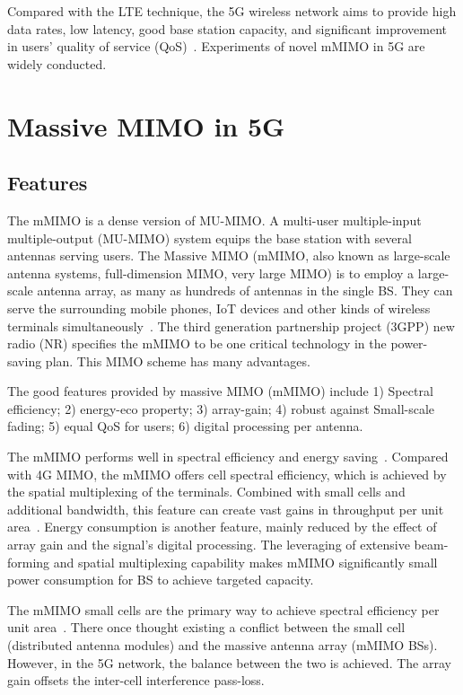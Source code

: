 \documentclass[12pt]{article}
\begin{document}
Compared with the LTE technique, the 5G wireless network aims to provide high data rates, low latency, good base station capacity, and significant improvement in users' quality of service (QoS)~\cite{agiwal2016next}. Experiments of novel mMIMO in 5G are widely conducted.

\section{Massive MIMO in 5G}
\label{sec:5G}

\subsection{Features}
The mMIMO is a dense version of MU-MIMO. A multi-user multiple-input multiple-output (MU-MIMO) system equips the base station with several antennas serving users. The Massive MIMO (mMIMO, also known as large-scale antenna systems, full-dimension MIMO, very large MIMO) is to employ a large-scale antenna array, as many as hundreds of antennas in the single BS. They can serve the surrounding mobile phones, IoT devices and other kinds of wireless terminals simultaneously~\cite{larsson2017massive}. The third generation partnership project (3GPP) new radio (NR) specifies the mMIMO to be one critical technology in the power-saving plan. This MIMO scheme has many advantages.

The good features provided by massive MIMO (mMIMO) include 1) Spectral efficiency; 2) energy-eco property; 3) array-gain; 4) robust against Small-scale fading; 5) equal QoS for users; 6) digital processing per antenna.

The mMIMO performs well in spectral efficiency and energy saving~\cite{ngo2013energy,lopez2021survey}. Compared with 4G MIMO, the mMIMO offers cell spectral efficiency, which is achieved by the spatial multiplexing of the terminals. Combined with small cells and additional bandwidth, this feature can create vast gains in throughput per unit area~\cite{papadopoulos2016massive}. Energy consumption is another feature, mainly reduced by the effect of array gain and the signal's digital processing. The leveraging of extensive beam-forming and spatial multiplexing capability makes mMIMO significantly small power consumption for BS to achieve targeted capacity.

The mMIMO small cells are the primary way to achieve spectral efficiency per unit area~\cite{papadopoulos2016massive}. There once thought existing a conflict between the small cell (distributed antenna modules) and the massive antenna array (mMIMO BSs). However, in the 5G network, the balance between the two is achieved. The array gain offsets the inter-cell interference pass-loss.
\end{document}
